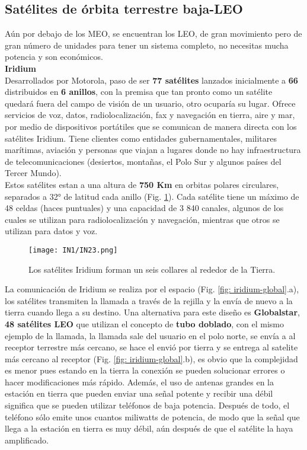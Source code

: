 \documentclass[
	12pt, %
	fleqn, %
	a4paper, %
	oneside, %
]{LegrandOrangeBook}
\begin{document}
\subsection{Satélites de órbita terrestre baja-LEO}
Aún por debajo de los MEO, se encuentran los LEO, de gran movimiento pero de gran número de unidades para tener un sistema completo, no necesitas mucha potencia y son económicos.\\
\textbf{Iridium}\\
Desarrollados por Motorola, paso de ser \textbf{77 satélites} lanzados inicialmente a \textbf{66} distribuidos en \textbf{6 anillos},  con la premisa que tan pronto como un satélite quedará fuera del campo de visión de un usuario, otro ocuparía su lugar. Ofrece servicios de voz, datos, radiolocalización, fax y navegación en tierra, aire y mar, por medio de dispositivos portátiles que se comunican de manera directa con los satélites Iridium. Tiene clientes como entidades gubernamentales, militares marítimas, aviación y personas que viajan a lugares donde no hay infraestructura de telecomunicaciones (desiertos, montañas, el Polo Sur y algunos países del Tercer Mundo).\\
Estos satélites estan a una altura de \textbf{750 Km} en orbitas polares circulares, separados a 32° de latitud cada anillo (Fig. \ref{fig: iridium}). Cada satélite tiene un máximo de 48 celdas (haces puntuales) y una capacidad de 3 840 canales, algunos de los cuales se utilizan para radiolocalización y navegación, mientras que otros se utilizan para datos y voz.
\begin{figure}[H]
\centering
\texttt{[image: IN1/IN23.png]}
\caption{Los satélites Iridium forman un seis collares al rededor de la Tierra.}
\label{fig: iridium}
\end{figure}
La comunicación de Iridium se realiza por el espacio (Fig. \ref{fig: iridium-global}.a), los satélites transmiten la llamada a través de la rejilla y la envía de nuevo a la tierra cuando llega a su destino. Una alternativa para este diseño es \textbf{Globalstar}, \textbf{48 satélites LEO} que utilizan el concepto de \textbf{tubo doblado}, con el mismo ejemplo de la llamada, la llamada sale del usuario en el polo norte, se envía a al receptor terrestre más cercano, se hace el envió por tierra y se entrega al satelite más cercano al receptor (Fig. \ref{fig: iridium-global}.b), es obvio que la complejidad es menor pues estando en la tierra la conexión se pueden solucionar errores o hacer modificaciones más rápido. Además, el uso de antenas grandes en la estación en tierra que pueden enviar una señal potente y recibir una débil significa que se pueden utilizar teléfonos de baja potencia. Después de todo, el teléfono sólo emite unos cuantos miliwatts de potencia, de modo que la señal que llega a la estación en tierra es muy débil, aún después de que el satélite la haya amplificado.
\end{document}
